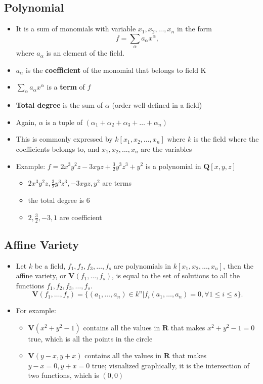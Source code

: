 \documentclass[11pt]{article}
\begin{document}
\subsection{Polynomial}
\begin{itemize}
    \item It is a sum of monomials with variable $x_1, x_2,..., x_n$ in the form $$f=\sum_\alpha a_\alpha x^\alpha,$$ where $a_\alpha$ is an element of the field. 
    \item $a_\alpha$ is the \textbf{coefficient} of the monomial that belongs to field K
    \item $\sum_\alpha a_\alpha x^\alpha$ is a \textbf{term} of $f$
    \item \textbf{Total degree} is the sum of $\alpha$ (order well-defined in a field) 
    \item Again, $\alpha$ is a tuple of $(\alpha_1 + \alpha_2 + \alpha_3 + \dots + \alpha_n)$
    \item This is commonly expressed by $k[x_1, x_2,..., x_n]$ where $k$ is the field where the coefficients belongs to, and $x_1, x_2,..., x_n$ are the variables
    \item Example: $f=2x^3y^2z-3xyz + \frac{3}{2}y^3z^3 +y^2$ is a polynomial in $\mathbf{Q}[x, y, z]$
    \begin{itemize}
        \item $2x^3y^2z, \frac{3}{2}y^3z^3, −3xyz, y^2$ are terms
        \item the total degree is 6
        \item $2, \frac{3}{2}, −3, 1$ are coefficient
    \end{itemize}
\end{itemize} 


\subsection{Affine Variety}
\begin{itemize}
    \item Let $k$ be a field, $f_1, f_2, f_3,\dots, f_s$ are polynomials in $k[x_1, x_2,..., x_n]$, then the affine variety, or $\mathbf{V}(f_1, \dots, f_s)$, is equal to the set of solutions to all the functions $f_1, f_2, f_3,\dots, f_s$. $$\mathbf{V}(f_1, \dots, f_s) = \{(a_1,\dots,a_n) \in k^n | f_i(a_1, \dots, a_n) = 0 , \forall 1 \le i \le s\}.$$
    \item For example: 
    \begin{itemize}
        \item $\mathbf{V}(x^2 + y^2 -1)$ contains all the values in $\mathbf{R}$ that makes $x^2 + y^2 -1 = 0$ true, which is all the points in the circle
        \item $\mathbf{V}(y-x, y + x)$ contains all the values in $\mathbf{R}$ that makes $y-x = 0, y + x = 0$ true; visualized graphically, it is the intersection of two functions, which is $(0, 0)$
    \end{itemize}
\end{itemize} 
\end{document}

